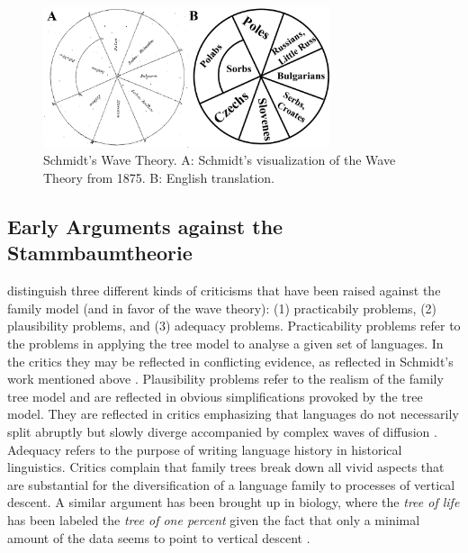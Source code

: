 \documentclass[svgnames,12pt]{scrartcl}
\begin{document}
{\begin{figure}[htb]
\centering
\includegraphics[width=0.75\textwidth]{images/schmidt-1875.pdf}
\caption{Schmidt's Wave Theory. A: Schmidt's visualization of the Wave Theory from 1875. B: English
translation.}
\label{fig:schmidt1875}
\end{figure}

\subsection{Early Arguments against the Stammbaumtheorie}

\citet[118-120]{Geisler2013} distinguish three different kinds of
criticisms that have been raised against the family model (and in favor of the wave theory): (1)
practicabily problems, (2) plausibility problems, and (3) adequacy problems. Practicability
problems refer to the problems in applying the tree model to analyse a given set of languages. In
the critics they may be reflected in conflicting evidence, as reflected in Schmidt's work mentioned
above \citep{Schmidt1872}. Plausibility problems refer to the realism of the family tree model and
are reflected in obvious simplifications provoked by the tree model. They are reflected in critics
emphasizing that languages do not necessarily split abruptly but slowly diverge accompanied by
complex waves of diffusion \citep{Schuchardt1870,Schmidt1872}. Adequacy refers to the purpose of
writing language history in historical linguistics. Critics complain that family trees break down
all vivid aspects that are substantial for the diversification of a language family to processes of
vertical descent. A similar argument has been brought up in biology, where the \emph{tree of life}
has been labeled the \emph{tree of one percent} given the fact that only a minimal amount of the
data seems to point to vertical descent \citep{Dagan2006}.
 
}
\end{document}

